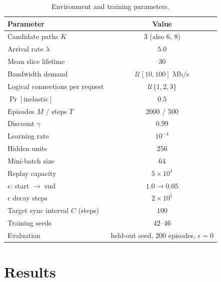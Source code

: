 \documentclass[10pt,journal,comsoc]{IEEEtran}
\begin{document}
\begin{table}[t]
\centering
\caption{Environment and training parameters.}
\label{tab:hyper}
\renewcommand{\arraystretch}{1.15}
\begin{tabular}{lc}
\toprule
\textbf{Parameter} & \textbf{Value} \\
\midrule
Candidate paths $K$              & $3$ (also $6$, $8$) \\
Arrival rate $\lambda$           & $5.0$ \\
Mean slice lifetime              & $30$ \\
Bandwidth demand                 & $\mathcal{U}[10,100]$ Mb/s \\
Logical connections per request  & $\mathcal{U}\{1,2,3\}$ \\
$\Pr[\text{inelastic}]$          & $0.5$ \\
\midrule
Episodes $M$ / steps $T$         & $2000$ / $500$ \\
Discount $\gamma$                & $0.99$ \\
Learning rate                    & $10^{-4}$ \\
Hidden units                     & $256$ \\
Mini-batch size                  & $64$ \\
Replay capacity                  & $5\times10^{4}$ \\
$\epsilon$: start $\to$ end      & $1.0 \to 0.05$ \\
$\epsilon$ decay steps           & $2\times10^{5}$ \\
Target sync interval $C$ (steps) & $100$ \\
Training seeds                   & $42$--$46$ \\
Evaluation                       & held-out seed, $200$ episodes, $\epsilon=0$ \\
\bottomrule
\end{tabular}
\end{table}

\section{Results} \label{results}
\end{document}
